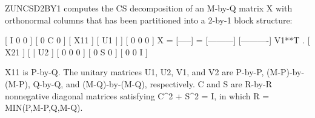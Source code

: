 \begin{DoxyVerb} ZUNCSD2BY1 computes the CS decomposition of an M-by-Q matrix X with
 orthonormal columns that has been partitioned into a 2-by-1 block
 structure:

                                [  I  0  0 ]
                                [  0  C  0 ]
          [ X11 ]   [ U1 |    ] [  0  0  0 ]
      X = [-----] = [---------] [----------] V1**T .
          [ X21 ]   [    | U2 ] [  0  0  0 ]
                                [  0  S  0 ]
                                [  0  0  I ]
 
 X11 is P-by-Q. The unitary matrices U1, U2, V1, and V2 are P-by-P,
 (M-P)-by-(M-P), Q-by-Q, and (M-Q)-by-(M-Q), respectively. C and S are
 R-by-R nonnegative diagonal matrices satisfying C^2 + S^2 = I, in
 which R = MIN(P,M-P,Q,M-Q).\end{DoxyVerb}
 
